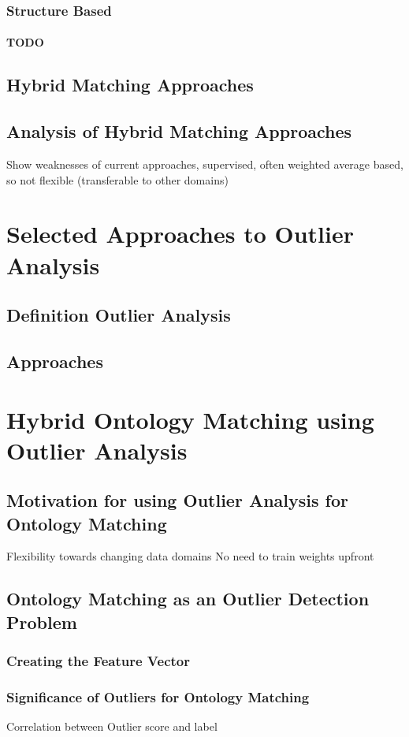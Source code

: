 \documentclass[11pt,titlepage,oneside,openany,a4paper]{report}
\begin{document}
\subsection{Structure Based}
 \subsubsection{TODO}
\section{Hybrid Matching Approaches}
\section{Analysis of Hybrid Matching Approaches}
Show weaknesses of current approaches, supervised, often weighted average based, so not flexible (transferable to other domains)

\chapter{Selected Approaches to Outlier Analysis}
\section{Definition Outlier Analysis}
\section{Approaches}


\chapter{Hybrid Ontology Matching using Outlier Analysis}
\section{Motivation for using Outlier Analysis for Ontology Matching}
Flexibility towards changing data domains
No need to train weights upfront
\section{Ontology Matching as an Outlier Detection Problem}
\subsection{Creating the Feature Vector}
\subsection{Significance of Outliers for Ontology Matching}
Correlation between Outlier score and label
\end{document}
